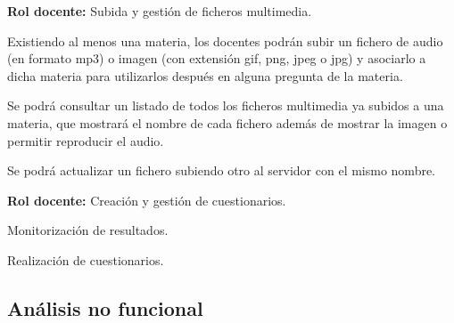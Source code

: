 \begin{rf0}
	\item  \textbf{Rol docente:} Subida y gestión de ficheros multimedia.
		\begin{rf0*}
			\item Existiendo al menos una materia, los docentes podrán subir un fichero de audio (en formato mp3) o imagen (con extensión gif, png, jpeg o jpg) y asociarlo a dicha materia para utilizarlos después en alguna pregunta de la materia.
			\item Se podrá consultar un listado de todos los ficheros multimedia ya subidos a una materia, que mostrará el nombre de cada fichero además de mostrar la imagen o permitir reproducir el audio.
			\item Se podrá actualizar un fichero subiendo otro al servidor con el mismo nombre.
		\end{rf0*}

	\item \textbf{Rol docente:} Creación y gestión de cuestionarios.
	\item Monitorización de resultados.

	
	\item Realización de cuestionarios.
	


\end{rf0}


\subsection{Análisis no funcional}


